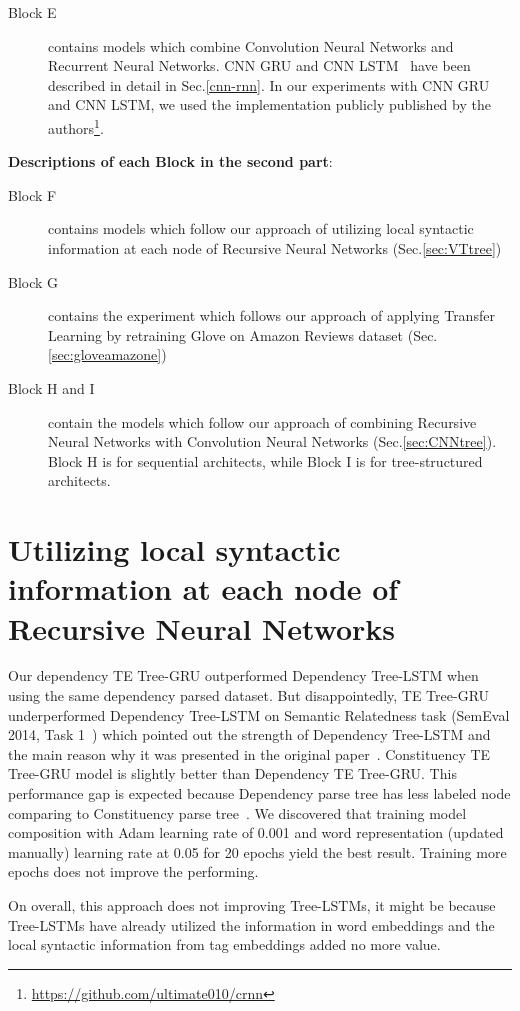 \begin{description}
\item[Block E] contains models which combine Convolution Neural Networks and Recurrent Neural Networks.
CNN GRU and CNN LSTM~\cite{cnn-rnn} have been described in detail in Sec.\ref{cnn-rnn}.
In our experiments with CNN GRU and CNN LSTM, we used the implementation publicly published by the authors\footnote{\url{https://github.com/ultimate010/crnn}}.
\end{description}

\textbf{Descriptions of each Block in the second part}:
\begin{description}
\item[Block F] contains models which follow our approach of utilizing local syntactic information at each node of Recursive Neural Networks (Sec.\ref{sec:VTtree})
\item[Block G] contains the experiment which follows our approach of applying Transfer Learning by retraining Glove on Amazon Reviews dataset (Sec.\ref{sec:gloveamazone})
\item[Block H and I] contain the models which follow our approach of combining Recursive Neural Networks with Convolution Neural Networks (Sec.\ref{sec:CNNtree}).
Block H is for sequential architects, while Block I is for tree-structured architects.
\end{description}

\section{Utilizing local syntactic information at each node of Recursive Neural Networks}
Our dependency TE Tree-GRU outperformed Dependency Tree-LSTM when using the same dependency parsed dataset.
But disappointedly, TE Tree-GRU underperformed Dependency Tree-LSTM on Semantic Relatedness task (SemEval 2014, Task 1~\cite{SemeEvalTask1}) which pointed out the strength of Dependency Tree-LSTM and the main reason why it was presented in the original paper~\cite{treeLSTM}.
Constituency TE Tree-GRU model is slightly better than Dependency TE Tree-GRU.
This performance gap is expected because Dependency parse tree has less labeled node comparing to Constituency parse tree~\cite{treeLSTM}.
We discovered that training model composition with Adam learning rate of 0.001 and word representation (updated manually) learning rate at 0.05 for 20 epochs yield the best result.
Training more epochs does not improve the performing.

\label{unproved:tag-useless}
On overall, this approach does not improving Tree-LSTMs, it might be because Tree-LSTMs have already utilized the information in word embeddings and the local syntactic information from tag embeddings added no more value.


